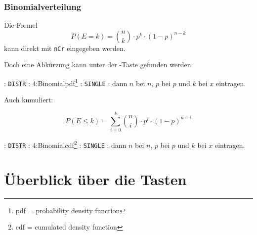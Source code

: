 \subsubsection{Binomialverteilung}
Die Formel
$$P(E = k) = {n \choose k}\cdot{}p^k\cdot{}(1-p)^{n-k}$$
kann direkt mit \texttt{nCr} eingegeben werden.

Doch eine Abkürzung kann unter der -Taste gefunden werden:

: \texttt{DISTR} :
4:Binomialpdf\footnote{pdf = probability density function} :
\texttt{SINGLE} : dann $n$ bei $n$, $p$ bei $p$ und $k$ bei $x$ eintragen.

Auch kumuliert:

 $$P(E \le k) = \sum_{i=0}^{k}{n \choose i}\cdot{}p^i\cdot{}(1-p)^{n-i}$$

: \texttt{DISTR} :
4:Binomialcdf\footnote{cdf = cumulated density function} :
\texttt{SINGLE} : dann $n$ bei $n$, $p$ bei $p$ und $k$ bei $x$ eintragen.

     


\newpage


\section*{Überblick über die Tasten}

